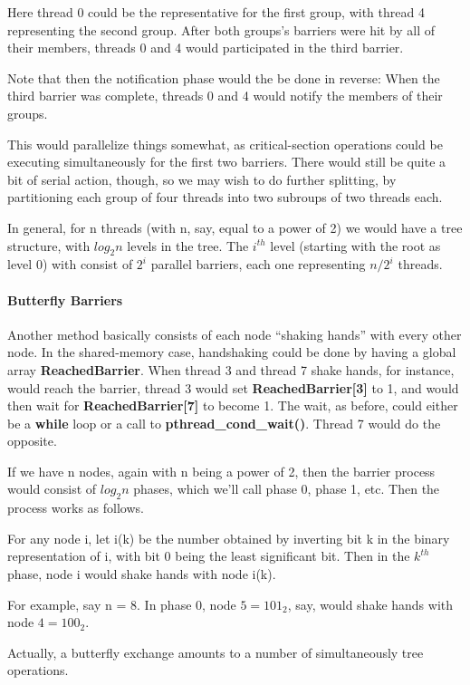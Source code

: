 Here thread 0 could be the representative for the first group, with
thread 4 representing the second group.  After both groups's barriers
were hit by all of their members, threads 0 and 4 would participated in
the third barrier.

Note that then the notification phase would the be done in reverse:
When the third barrier was complete, threads 0 and 4 would notify the
members of their groups.

This would parallelize things somewhat, as critical-section operations
could be executing simultaneously for the first two barriers.  There
would still be quite a bit of serial action, though, so we may wish to
do further splitting, by partitioning each group of four threads into
two subroups of two threads each.

In general, for n threads (with n, say, equal to a power of 2) we would
have a tree structure, with $log_2n$ levels in the tree.  The $i^{th}$
level (starting with the root as level 0) with consist of $2^i$ parallel
barriers, each one representing $n/2^i$ threads.

\paragraph{Butterfly Barriers}

Another method basically consists of each node ``shaking hands'' with
every other node.  In the shared-memory case, handshaking could be done
by having a global array {\bf ReachedBarrier}.  When thread 3 and thread
7 shake hands, for instance, would reach the barrier, thread 3 would set
{\bf ReachedBarrier[3]} to 1, and would then wait for {\bf
ReachedBarrier[7]} to become 1.  The wait, as before, could either be a
{\bf while} loop or a call to {\bf pthread\_cond\_wait()}.  Thread 7
would do the opposite.

If we have n nodes, again with n being a power of 2, then the barrier
process would consist of $log_2n$ phases, which we'll call phase 0,
phase 1, etc.  Then the process works as follows.

For any node i, let i(k) be the number obtained by inverting bit k in
the binary representation of i, with bit 0 being the least significant
bit.  Then in the $k^{th}$ phase, node i would shake hands with
node i(k).

For example, say n = 8.  In phase 0, node $5 = 101_2$, say, would shake
hands with node $4 = 100_2$.

Actually, a butterfly exchange amounts to a number of simultaneously
tree operations.

